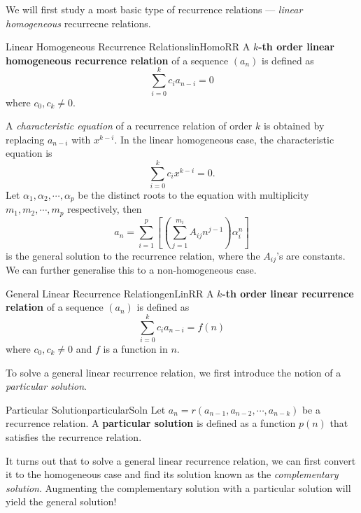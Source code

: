 \documentclass[math]{amznotes}
\theoremstyle{remark}
\begin{document}
We will first study a most basic type of recurrence relations --- \textit{linear homogeneous} recurrecne relations.
\begin{dfnbox}{Linear Homogeneous Recurrence Relations}{linHomoRR}
    A {\color{red} \textbf{$k$-th order linear homogeneous recurrence relation}} of a sequence $(a_n)$ is defined as
    \begin{equation*}
        \sum_{i = 0}^{k}c_ia_{n - i} = 0
    \end{equation*}
    where $c_0, c_k \neq 0$.
\end{dfnbox}
A \textit{characteristic equation} of a recurrence relation of order $k$ is obtained by replacing $a_{n - i}$ with $x^{k - i}$. In the linear homogeneous case, the characteristic equation is 
\begin{equation*}
    \sum_{i = 0}^{k}c_ix^{k - i} = 0.
\end{equation*} 
Let $\alpha_1, \alpha_2, \cdots, \alpha_p$ be the distinct roots to the equation with multiplicity $m_1, m_2, \cdots, m_p$ respectively, then 
\begin{equation*}
    a_n = \sum_{i = 1}^{p}\left[\left(\sum_{j = 1}^{m_i}A_{ij}n^{j - 1}\right)\alpha_i^n\right]
\end{equation*}
is the general solution to the recurrence relation, where the $A_{ij}$'s are constants. We can further generalise this to a non-homogeneous case.
\begin{dfnbox}{General Linear Recurrence Relation}{genLinRR}
    A {\color{red} \textbf{$k$-th order linear recurrence relation}} of a sequence $(a_n)$ is defined as
    \begin{equation*}
        \sum_{i = 0}^{k}c_ia_{n - i} = f(n)
    \end{equation*}
    where $c_0, c_k \neq 0$ and $f$ is a function in $n$.
\end{dfnbox}
To solve a general linear recurrence relation, we first introduce the notion of a \textit{particular solution}.
\begin{dfnbox}{Particular Solution}{particularSoln}
    Let $a_n = r(a_{n - 1}, a_{n - 2}, \cdots, a_{n - k})$ be a recurrence relation. A {\color{red} \textbf{particular solution}} is defined as a function $p(n)$ that satisfies the recurrence relation.
\end{dfnbox}
It turns out that to solve a general linear recurrence relation, we can first convert it to the homogeneous case and find its solution known as the \textit{complementary solution}. Augmenting the complementary solution with a particular solution will yield the general solution!
\end{document}
